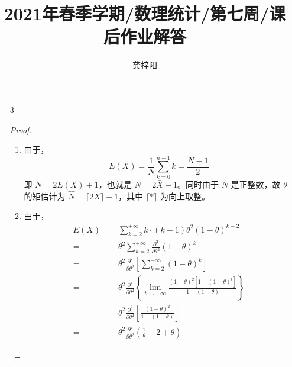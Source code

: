 \documentclass[normal,founder,mtpro2,cn]{elegantnote}
\title{2021年春季学期/数理统计/第七周/课后作业解答}
\author{龚梓阳}
\date{\zhtoday}
\begin{document}
\maketitle
\begin{enumerate}
    \item[3]
        \begin{proof}
            \begin{enumerate}
                \item
                      由于，
                      \begin{equation*}
                          E(X)=\frac{1}{N}\sum_{k=0}^{n-1}k=\frac{N-1}{2}
                      \end{equation*}
                      即 $N=2E(X)+1$，也就是 $\hat{N}=2\bar{X}+1$。同时由于 $N$ 是正整数，故 $\theta$ 的矩估计为 $\hat{N}=\lceil 2\bar{X}\rceil+1$，其中 $\lceil*\rceil$ 为向上取整。
                \item
                      由于，
                      \begin{equation*}
                          \begin{aligned}
                              E(X)= & \sum_{k=2}^{+\infty}k\cdot(k-1)\theta^{2}(1-\theta)^{k-2}                                                                                                             \\
                              =     & \theta^{2}\sum_{k=2}^{+\infty} \frac{\partial^{2}}{\partial\theta^{2}}(1-\theta)^{k}                                                                                  \\
                              =     & \theta^{2}\frac{\partial^{2}}{\partial\theta^{2}}\left[\sum_{k=2}^{+\infty}(1-\theta)^{k}\right]                                                                      \\
                              =     & \theta^{2}\frac{\partial^{2}}{\partial\theta^{2}}\left\{\lim_{t\rightarrow+\infty}\frac{(1-\theta)^{2}\left[1-\left(1-\theta\right)^{t}\right]}{1-(1-\theta)}\right\} \\
                              =     & \theta^{2}\frac{\partial^{2}}{\partial\theta^{2}}\left[\frac{(1-\theta)^{2}}{1-(1-\theta)}\right]                                                                     \\
                              =     & \theta^{2}\frac{\partial^{2}}{\partial\theta^{2}}\left(\frac{1}{\theta}-2+\theta\right)                                                                               \\

\end{aligned}
\end{equation*}
\end{enumerate}
\end{proof}
\end{enumerate}
\end{document}

